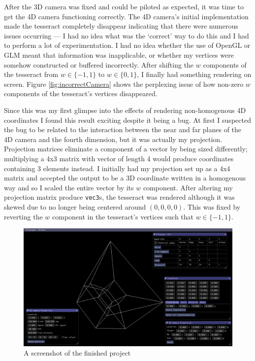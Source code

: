 \documentclass[11pt, a4paper]{article}
\begin{document}
\pagebreak

After the 3D camera was fixed and could be piloted as expected, it was time to get the 4D camera functioning correctly. The 4D camera's initial implementation made the tesseract completely disappear indicating that there were numerous issues occurring --- I had no idea what was the `correct' way to do this and I had to perform a lot of experimentation. I had no idea whether the use of OpenGL or GLM meant that information was inapplicable, or whether my vertices were somehow constructed or buffered incorrectly. After shifting the $w$ components of the tesseract from $w \in \{-1, 1\}$ to $w \in \{0, 1\}$, I finally had something rendering on screen. Figure \ref{fig:incorrectCamera} shows the perplexing issue of how non-zero $w$ components of the tesseract's vertices disappeared.

Since this was my first glimpse into the effects of rendering non-homogenous 4D coordinates I found this result exciting despite it being a bug. At first I suspected the bug to be related to the interaction between the near and far planes of the 4D camera and the fourth dimension, but it was actually my projection. Projection matrices eliminate a component of a vector by being sized differently; multiplying a 4x3 matrix with vector of length 4 would produce coordinates containing 3 elements instead. I initially had my projection set up as a 4x4 matrix and accepted the output to be a 3D coordinate written in a homogenous way and so I scaled the entire vector by its $w$ component. After altering my projection matrix produce \texttt{vec3}s, the tesseract was rendered although it was skewed due to no longer being centered around $(0, 0, 0, 0)$. This was fixed by reverting the $w$ component in the tesseract's vertices such that $w \in \{-1, 1\}$.

\begin{figure}[!h]
  \centering
  \includegraphics[width=\textwidth]{img/finished_project.png}
  \caption{A screenshot of the finished project}
  \label{fig:finishedProject}
\end{figure}
\pagebreak
\end{document}
